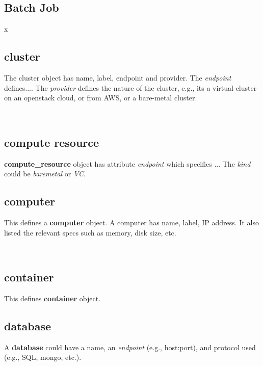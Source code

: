 \documentclass[9pt,twocolumn,twoside]{styles/osajnl}
\begin{document}
\subsection{Batch Job}

x
\subsection{cluster}

The cluster object has name, label, endpoint and provider. The \textit{endpoint}
defines.... The \textit{provider} defines the nature of the cluster,
e.g., its a virtual cluster on an openstack cloud, or from AWS, or a bare-metal
cluster.


\
\subsection{compute resource}

\textbf{compute\_resource} object has attribute \textit{endpoint} which
specifies ... The \textit{kind} could be \textit{baremetal} or \textit{VC}.


\subsection{computer}

This defines a \textbf{computer} object. A computer has name, label,
IP address. It also listed the relevant specs such as memory, disk
size, etc.

\
\subsection{container}

This defines \textbf{container} object.


\subsection{database}

A \textbf{database} could have a name, an \textit{endpoint} (e.g., host:port),
and protocol used (e.g., SQL, mongo, etc.).

\end{document}
